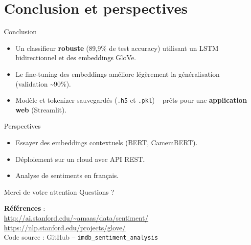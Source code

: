 \documentclass[10pt, aspectratio=169]{beamer}
\begin{document}
\section{Conclusion et perspectives}
\begin{frame}{Conclusion}
\begin{itemize}
    \item Un classifieur \textbf{robuste} (89,9\% de test accuracy) utilisant un \textcolor{mainblue}{LSTM bidirectionnel} et des \textcolor{mainred}{embeddings GloVe}.
    \item Le fine-tuning des embeddings améliore légèrement la généralisation (validation \textasciitilde 90\%).
    \item Modèle et tokenizer sauvegardés (\texttt{.h5} et \texttt{.pkl}) – prêts pour une \textbf{application web} (Streamlit).
\end{itemize}
\vspace{0.5cm}
\begin{block}{Perspectives}
\begin{itemize}
    \item Essayer des embeddings contextuels (BERT, CamemBERT).
    \item Déploiement sur un cloud avec API REST.
    \item Analyse de sentiments en français.
\end{itemize}
\end{block}
\end{frame}

\begin{frame}{Merci de votre attention}
\centering
\Huge \textcolor{mainred}{Questions ?}
\vspace{1cm}

\footnotesize
\textbf{Références} : \\
\url{http://ai.stanford.edu/~amaas/data/sentiment/} \\
\url{https://nlp.stanford.edu/projects/glove/} \\
Code source : GitHub – \texttt{imdb\_sentiment\_analysis}
\end{frame}
\end{document}
